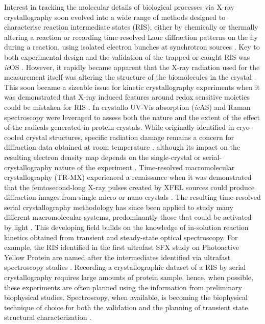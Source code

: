 Interest in tracking the molecular details of biological processes via X-ray crystallography soon evolved into a wide range of methods designed to characterise reaction intermediate states (RIS), either by chemically or thermally altering a reaction \parencite{finkFormationStableCrystalline1976,edmanHighresolutionXrayStructure1999} or recording time resolved Laue diffraction patterns on the fly during a reaction, using isolated electron bunches at synchrotron sources \parencite{srajerPhotolysisCarbonMonoxide1996}. Key to both experimental design and the validation of the trapped or caught RIS was \textit{ic}OS \parencite{bourgeoisAdvancesKineticProtein2005}. However, it rapidly became apparent that the X-ray radiation used for the measurement itself was altering the structure of the biomolecules in the crystal \parencite{ravelliFingerprintThatXrays2000}. This soon became a sizeable issue for kinetic crystallography experiments when it was demonstrated that X-ray induced features around redox sensitive moieties could be mistaken for RIS \parencite{matsuiSpecificDamageInduced2002}. In crystallo UV-Vis absorption (\textit{ic}AS) \parencite{mcgeehanColouringCryocooledCrystals2009} and Raman \parencite{carpentierRamanAssistedCrystallographySuggests2010} spectroscopy were leveraged to assess both the nature and the extent of the effect of the radicals generated in protein crystals. While originally identified in cryo-cooled crystal structures, specific radiation damage remains a concern for diffraction data obtained at room temperature \parencite{naveUnderstandingRadiationDamage2005,garmanRadiationDamageMacromolecular2010,garmanRadiationDamageBiological2023}, although its impact on the resulting electron density map depends on the single-crystal or serial-crystallography nature of the experiment \parencite{gotthardSpecificRadiationDamage2019,delamoraRadiationDamageDose2020}. 
Time-resolved macromolecular crystallography (TR-MX) experienced a renaissance when it was demonstrated that the femtosecond-long X-ray pulses created by XFEL sources could produce diffraction images from single micro or nano crystals \parencite{neutzePotentialBiomolecularImaging2000,chapmanFemtosecondXrayProtein2011}. The resulting time-resolved serial crystallography methodology has since been applied to study many different macromolecular systems, predominantly those that could be activated by light \parencite{brandenAdvancesChallengesTimeresolved2021}. This developing field builds on the knowledge of in-solution reaction kinetics obtained from transient and steady-state optical spectroscopy. For example, the RIS identified in the first ultrafast SFX study on Photoactive Yellow Protein \parencite{pandeFemtosecondStructuralDynamics2016} are named after the intermediates identified via ultrafast spectroscopy studies \parencite{lincolnPhotoisomerisationQuantumYield2012}. Recording a crystallographic dataset of a RIS by serial crystallography requires large amounts of protein sample, hence, when possible, these experiments are often planned using the information from preliminary biophysical studies. Spectroscopy, when available, is becoming the biophysical technique of choice for both the validation and the planning of transient state structural characterization \parencite{nasskovacsThreedimensionalViewUltrafast2019}. 
